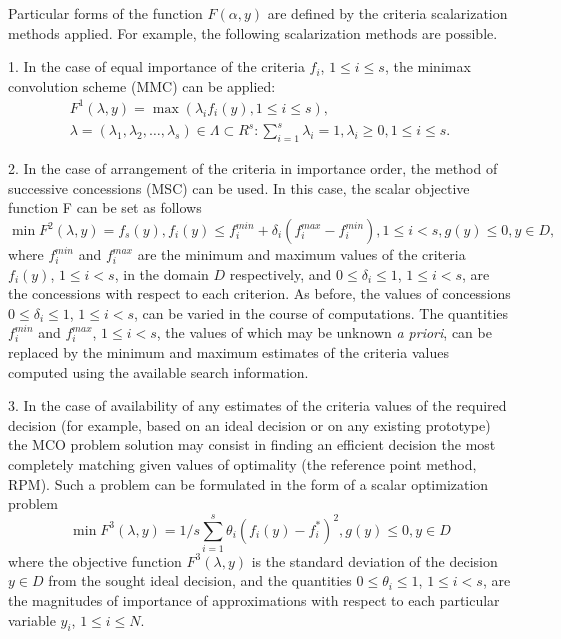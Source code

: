 \documentclass[runningheads]{llncs}
\begin{document}
Particular forms of the function $F(\alpha,y)$ are defined by the criteria scalarization methods applied. For example, the following scalarization methods are possible.

1.	In the case of equal importance of the criteria $f_i$, $1 \leq i \leq s$, the minimax convolution scheme (MMC) \cite{c3} can be applied:
\begin{equation}\label{eq:10}
\begin{split}
  F^1 (\lambda,y)=\max{⁡(\lambda_i f_i(y), 1 \leq i \leq s)},  \\
  \lambda=(\lambda_1,\lambda_2,\dots,\lambda_s) \in \Lambda \subset R^s:\sum_{i=1}^s{\lambda_i =1},\lambda_i \geq 0, 1 \leq i \leq s.
\end{split}
\end{equation}

2.	In the case of arrangement of the criteria in importance order, the method of successive concessions (MSC) \cite{c2,c3} can be used. In this case, the scalar objective function F can be set as follows
\begin{equation}\label{eq:11}
	\min F^2 (\lambda,y)=f_s (y),f_i (y) \leq f_i^{min}+\delta_i (f_i^{max}-f_i^{min} ),1 \leq i<s,g(y)\leq 0,y\in D,
\end{equation}
where $f_i^{min}$ and $f_i^{max}$ are the minimum and maximum values of the criteria $f_i (y)$, $1\leq i<s$, in the domain $D$ respectively, and $0 \leq \delta_i \leq 1$, $1\leq i<s$, are the concessions with respect to each criterion. As before, the values of concessions $0 \leq \delta_i\leq 1$, $1 \leq i<s$, can be varied in the course of computations. The quantities $f_i^{min}$ and $f_i^{max}$,  $1 \leq i<s$, the values of which may be unknown \textit{a priori}, can be replaced by the minimum and maximum estimates of the criteria values computed using the available search information.

3.	In the case of availability of any estimates of the criteria values of the required decision (for example, based on an ideal decision or on any existing prototype) the MCO problem solution may consist in finding an efficient decision the most completely matching given values of optimality (the reference point method, RPM). Such a problem can be formulated in the form of a scalar optimization problem
\begin{equation}\label{eq:12}
	\min{F^3 (\lambda,y) = 1 / s \sum_{i=1}^s{\theta_i (f_i (y)-f_i^* )^2 } },g(y)\leq 0,y \in D	
\end{equation}
where the objective function $F^3 (\lambda,y)$ is the standard deviation of the decision $y \in D$ from the sought ideal decision, and the quantities $0 \leq \theta_i \leq 1$, $1 \leq i<s$, are the magnitudes of importance of approximations with respect to each particular variable $y_i$, $1\leq i\leq N$.
\end{document}
